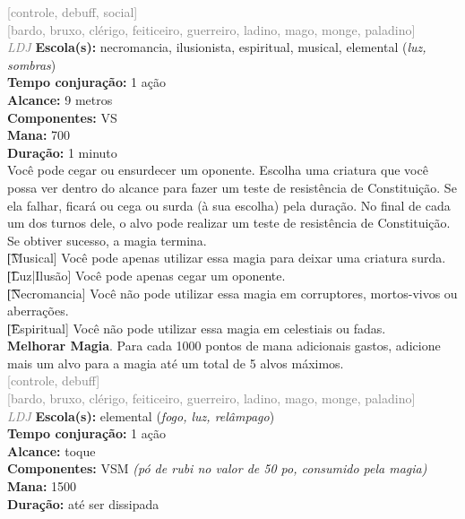 \documentclass{RPG_Adventure}[2021/10/20]
\begin{document}
{\scriptsize \textcolor{gray}{[controle, debuff, social]\\}}
{\scriptsize \textcolor{gray}{[bardo, bruxo, clérigo, feiticeiro, guerreiro, ladino, mago, monge, paladino]\\}}
{\tiny \textcolor{gray}{\textit{LDJ}}}
{\small \t \textbf{Escola(s):} necromancia, ilusionista, espiritual, musical, elemental (\textit{luz, sombras})\\\t \textbf{Tempo conjuração:} 1 ação\\\t \textbf{Alcance:} 9 metros\\\t \textbf{Componentes:} VS\\\t \textbf{Mana:} 700\\\t \textbf{Duração:} 1 minuto\\}
{\normalsize Você pode cegar ou ensurdecer um oponente. Escolha uma criatura que você possa ver dentro do alcance para fazer um teste de resistência de Constituição. Se ela falhar, ficará ou cega ou surda (à sua escolha) pela duração. No final de cada um dos turnos dele, o alvo pode realizar um teste de resistência de Constituição. Se obtiver sucesso, a magia termina.\\\t [Musical] Você pode apenas utilizar essa magia para deixar uma criatura surda.\\\t [Luz|Ilusão] Você pode apenas cegar um oponente.\\\t [Necromancia] Você não pode utilizar essa magia em corruptores, mortos-vivos ou aberrações.\\\t [Espiritual] Você não pode utilizar essa magia em celestiais ou fadas.\\\t \textbf{Melhorar Magia}. Para cada 1000 pontos de mana adicionais gastos, adicione mais um alvo para a magia até um total de 5 alvos máximos.\\}
{\scriptsize \textcolor{gray}{[controle, debuff]\\}}
{\scriptsize \textcolor{gray}{[bardo, bruxo, clérigo, feiticeiro, guerreiro, ladino, mago, monge, paladino]\\}}
{\tiny \textcolor{gray}{\textit{LDJ}}}
{\small \t \textbf{Escola(s):} elemental (\textit{fogo, luz, relâmpago})\\\t \textbf{Tempo conjuração:} 1 ação\\\t \textbf{Alcance:} toque\\\t \textbf{Componentes:} VSM \textit{(pó de rubi no valor de 50 po, consumido pela magia)}\\\t \textbf{Mana:} 1500\\\t \textbf{Duração:} até ser dissipada\\}
\end{document}
